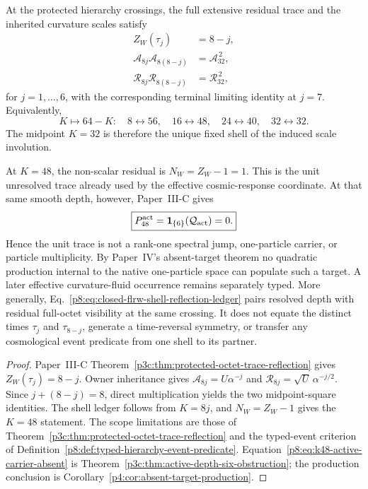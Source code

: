 \documentclass[12pt,a4paper]{article}
\begin{document}
\begin{corollary}
\label{p8:cor:closed-flrw-octet-reflection}
At the protected hierarchy crossings, the full extensive residual trace and
the inherited curvature scales satisfy
\begin{align}
\label{p8:eq:closed-flrw-octet-reflection}
 Z_W(\tau_j)&=8-j,\nonumber\\
 \mathcal A_{8j}\mathcal A_{8(8-j)}
 &=\mathcal A_{32}^{\,2},\\
 \mathcal R_{8j}\mathcal R_{8(8-j)}
 &=\mathcal R_{32}^{\,2},\nonumber
\end{align}
for \(j=1,\ldots,6\), with the corresponding terminal limiting identity at
\(j=7\).  Equivalently,
\begin{equation}
\label{p8:eq:closed-flrw-shell-reflection-ledger}
 \boxed{
 K\longmapsto64-K:\quad
 8\leftrightarrow56,\quad
 16\leftrightarrow48,\quad
 24\leftrightarrow40,\quad
 32\leftrightarrow32.}
\end{equation}
The midpoint \(K=32\) is therefore the unique fixed shell of the induced
scale involution.

At \(K=48\), the non-scalar residual is
\(N_W=Z_W-1=1\).  This is the unit unresolved trace already used by the
effective cosmic-response coordinate.  At that same smooth depth, however,
Paper~III-C gives
\begin{equation}
 \label{p8:eq:k48-active-carrier-absent}
 \boxed{P_{48}^{\rm act}
 =\mathbf1_{\{6\}}(\mathcal Q_{\rm act})=0.}
\end{equation}
Hence the unit trace is not a rank-one spectral jump, one-particle carrier,
or particle multiplicity.  By Paper~IV's absent-target theorem no quadratic
production internal to the native one-particle space can populate such a
target.  A later effective curvature-fluid occurrence remains separately
typed.  More generally,
Eq.~\eqref{p8:eq:closed-flrw-shell-reflection-ledger} pairs resolved depth
with residual full-octet visibility at the same crossing.  It does not equate
the distinct times \(\tau_j\) and \(\tau_{8-j}\), generate a time-reversal
symmetry, or transfer any cosmological event predicate from one shell to its
partner.
\end{corollary}

\begin{proof}
Paper~III-C
Theorem~\ref{p3c:thm:protected-octet-trace-reflection} gives
\(Z_W(\tau_j)=8-j\).  Owner inheritance gives
\(\mathcal A_{8j}=U\alpha^{-j}\) and
\(\mathcal R_{8j}=\sqrt U\,\alpha^{-j/2}\).  Since
\(j+(8-j)=8\), direct multiplication yields the two midpoint-square
identities.  The shell ledger follows from \(K=8j\), and
\(N_W=Z_W-1\) gives the \(K=48\) statement.  The scope limitations are those
of Theorem~\ref{p3c:thm:protected-octet-trace-reflection} and the typed-event
criterion of Definition~\ref{p8:def:typed-hierarchy-event-predicate}.
Equation~\eqref{p8:eq:k48-active-carrier-absent} is
Theorem~\ref{p3c:thm:active-depth-six-obstruction}; the production conclusion
is Corollary~\ref{p4:cor:absent-target-production}.
\end{proof}
\end{document}
